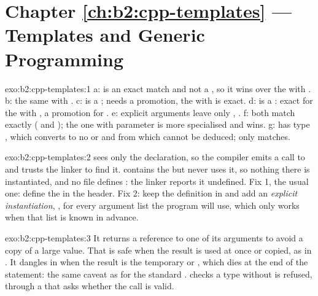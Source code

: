 \section*{Chapter \ref{ch:b2:cpp-templates} --- Templates and Generic Programming}

\begin{solution}{exo:b2:cpp-templates:1}
a:  is an exact match and not a , so it wins over the  with . b: the
same with . c:  is a ;  needs a promotion, the 
with  is exact. d:  is a : exact for the  with , a
promotion for . e: explicit  arguments leave only , . f: both
 match exactly ( and ); the one with parameter  is more specialised
and wins. g:  has type , which converts to no  or  and from
which  cannot be deduced; only  matches.
\end{solution}

\begin{solution}{exo:b2:cpp-templates:2}
 sees only the declaration, so the compiler emits a call to  and trusts the
linker to find it.  contains the  but never uses it, so nothing there is instantiated, and
no file defines : the linker reports it undefined. Fix 1, the usual one: define the  in the
header. Fix 2: keep the definition in  and add an \emph{explicit instantiation},
, for every argument list the program will use, which only works when that list
is known in advance.
\end{solution}

\begin{solution}{exo:b2:cpp-templates:3}
It returns a reference to one of its arguments to avoid a copy of a large value. That is safe when the result is
used at once or copied, as in . It dangles in  when the result is the temporary  or , which dies at the end of the statement: the same caveat
as for the standard .  checks a type without \code{<} is refused,
through a  that asks whether the call is valid.
\end{solution}

